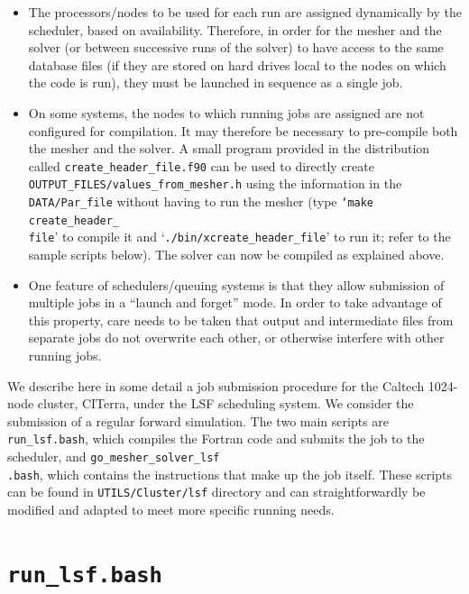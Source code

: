 \documentclass[oneside,english]{book}
\begin{document}
\begin{itemize}
\item The processors/nodes to be used for each run are assigned dynamically
by the scheduler, based on availability. Therefore, in order for the
mesher and the solver (or between successive runs of the solver) to
have access to the same database files (if they are stored on hard
drives local to the nodes on which the code is run), they must be
launched in sequence as a single job.
\item On some systems, the nodes to which running jobs are assigned are
not configured for compilation. It may therefore be necessary to pre-compile
both the mesher and the solver. A small program provided in the distribution
called \texttt{\small create\_header\_file.f90} can be used to directly
create\texttt{\small{} OUTPUT\_FILES/values\_from\_mesher.h} using
the information in the \texttt{\small DATA/Par\_file} without having
to run the mesher (type \texttt{\small `make}{\small{} }\texttt{\small create\_header\_}~\\
\texttt{\small file}' to compile it and `\texttt{\small ./bin/xcreate\_header\_file}'
to run it; refer to the sample scripts below). The solver can now
be compiled as explained above.
\item One feature of schedulers/queuing systems is that they allow submission
of multiple jobs in a {}``launch and forget'' mode. In order to
take advantage of this property, care needs to be taken that output
and intermediate files from separate jobs do not overwrite each other,
or otherwise interfere with other running jobs.
\end{itemize}
We describe here in some detail a job submission procedure for the
Caltech 1024-node cluster, CITerra, under the LSF scheduling system.
We consider the submission of a regular forward simulation. The two
main scripts are \texttt{\small run\_lsf.bash}, which compiles the
Fortran code and submits the job to the scheduler, and \texttt{\small go\_mesher\_solver\_lsf}~\\
\texttt{\small .bash}, which contains the instructions that make up
the job itself. These scripts can be found in \texttt{\small UTILS/Cluster/lsf}
directory and can straightforwardly be modified and adapted to meet
more specific running needs.


\section{\texttt{run\_lsf.bash}}
\end{document}
